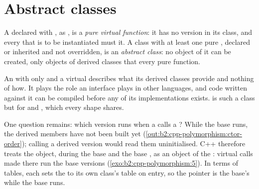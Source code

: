 \section{Abstract classes}\label{sec:b2:cpp-polymorphism:abstract}

\begin{definition}\label{def:b2:cpp-polymorphism:abstract}
A  declared with , as , is a \emph{pure virtual
function}: it has no version in its class, and every  that is to be
instantiated must  it. A class with at least one pure , declared or inherited and not
overridden, is an \emph{abstract class}: no object of it can be created, only objects of
derived classes that  every pure function.
\end{definition}

An  with only  and a virtual  describes what its derived classes
provide and nothing of how. It plays the role an interface plays in other languages, and code written against it
can be compiled before any of its implementations exists.  is such a class but for  and
, which every shape shares.

One question remains: which version runs when a  calls a ? While the base 
runs, the derived members have not been built yet (\cref{out:b2:cpp-polymorphism:ctor-order}); calling a derived
version would read them uninitialised. C++ therefore treats the object, during the base  and the base
, as an object of the : virtual calls made there run the base versions
(\cref{exo:b2:cpp-polymorphism:5}). In terms of tables, each  sets the  to its own class's
table on entry, so the pointer is the base's while the base  runs.

